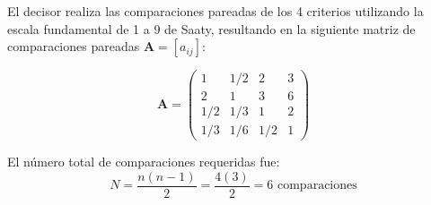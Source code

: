 \documentclass[11pt, letterpaper]{article}
\begin{document}
El decisor realiza las comparaciones pareadas de los 4 criterios utilizando la escala fundamental de 1 a 9 de Saaty, resultando en la siguiente matriz de comparaciones pareadas $\mathbf{A} = [a_{ij}]$:

\begin{equation}
    \mathbf{A} = \begin{pmatrix}
        1 & 1/2 & 2 & 3 \\
        2 & 1 & 3 & 6 \\
        1/2 & 1/3 & 1 & 2 \\
        1/3 & 1/6 & 1/2 & 1
    \end{pmatrix}
\end{equation}

El número total de comparaciones requeridas fue:
\begin{equation}
    N = \frac{n(n-1)}{2} = \frac{4(3)}{2} = 6 \text{ comparaciones}
\end{equation}
\end{document}

